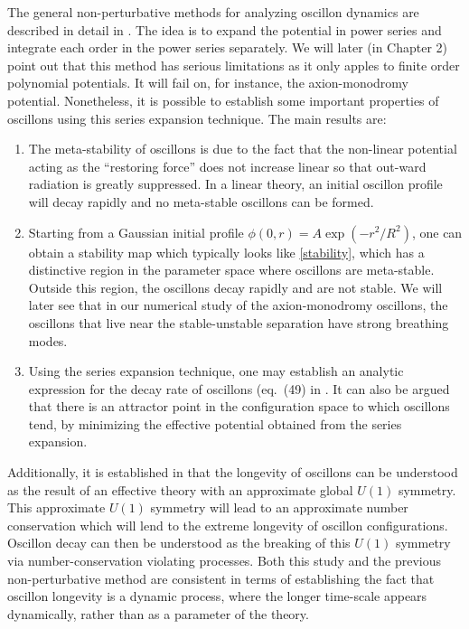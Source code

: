 \documentclass{report}
\begin{document}
The general non-perturbative methods for analyzing oscillon dynamics are described in detail in \cite{Copeland:1995fq, PhysRevD.80.125037, Gleiser:2008ty}. The idea is to expand the potential in power series and integrate each order in the power series separately. We will later (in Chapter 2) point out that this method has serious limitations as it only apples to finite order polynomial potentials. It will fail on, for instance, the axion-monodromy potential. Nonetheless, it is possible to establish some important properties of oscillons using this series expansion technique. The main results are:
\begin{enumerate}
\item The meta-stability of oscillons is due to the fact that the non-linear potential acting as the ``restoring force'' does not increase linear so that out-ward radiation is greatly suppressed. In a linear theory, an initial oscillon profile will decay rapidly and no meta-stable oscillons can be formed.
\item Starting from a Gaussian initial profile $\phi(0,r)=A\exp(-r^2/R^2)$, one can obtain a stability map which typically looks like \ref{stability}, which has a distinctive region in the parameter space where oscillons are meta-stable. Outside this region, the oscillons decay rapidly and are not stable. We will later see that in our numerical study of the axion-monodromy oscillons, the oscillons that live near the stable-unstable separation have strong breathing modes.
\item Using the series expansion technique, one may establish an analytic expression for the decay rate of oscillons (eq.~(49) in \cite{PhysRevD.80.125037}. It can also be argued that there is an attractor point in the configuration space to which oscillons tend, by minimizing the effective potential obtained from the series expansion.
\end{enumerate}

Additionally, it is established in \cite{Mukaida:2016hwd} that the longevity of oscillons can be understood as the result of an effective theory with an approximate global $U(1)$ symmetry. This approximate $U(1)$ symmetry will lead to an approximate number conservation which will lend to the extreme longevity of oscillon configurations. Oscillon decay can then be understood as the breaking of this $U(1)$ symmetry via number-conservation violating processes. Both this study and the previous non-perturbative method are consistent in terms of establishing the fact that oscillon longevity is a dynamic process, where the longer time-scale appears dynamically, rather than as a parameter of the theory.
\end{document}
